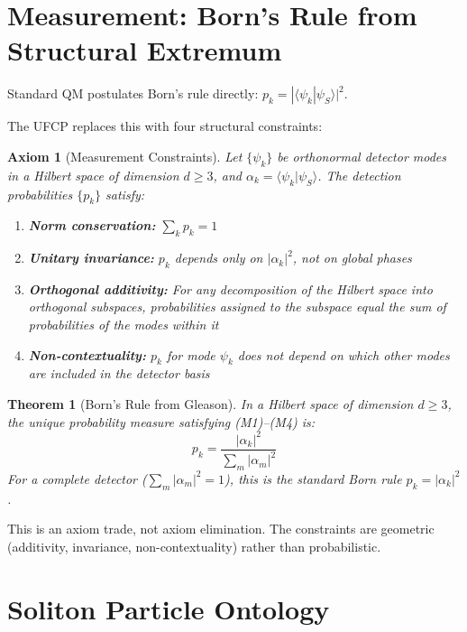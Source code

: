 \documentclass[11pt, a4paper]{article}
\newtheorem{axiom}{Axiom}[section]
\newtheorem{theorem}{Theorem}[section]
\begin{document}
\section{Measurement: Born's Rule from Structural Extremum}

Standard QM postulates Born's rule directly:
$p_k = |\langle \psi_k | \psi_S \rangle|^2$.

The UFCP replaces this with four structural constraints:

\begin{axiom}[Measurement Constraints]
Let $\{\psi_k\}$ be orthonormal detector modes in a Hilbert space
of dimension $d \geq 3$, and
$\alpha_k = \langle \psi_k | \psi_S \rangle$. The detection
probabilities $\{p_k\}$ satisfy:
\begin{enumerate}[label=(M\arabic*)]
  \item \textbf{Norm conservation:} $\sum_k p_k = 1$
  \item \textbf{Unitary invariance:} $p_k$ depends only on
        $|\alpha_k|^2$, not on global phases
  \item \textbf{Orthogonal additivity:} For any decomposition of
        the Hilbert space into orthogonal subspaces, probabilities
        assigned to the subspace equal the sum of probabilities of
        the modes within it
  \item \textbf{Non-contextuality:} $p_k$ for mode $\psi_k$ does
        not depend on which other modes are included in the detector
        basis
\end{enumerate}
\end{axiom}

\begin{theorem}[Born's Rule from Gleason]
In a Hilbert space of dimension $d \geq 3$, the unique probability
measure satisfying (M1)--(M4) is:
\begin{equation}
  p_k = \frac{|\alpha_k|^2}{\sum_m |\alpha_m|^2}
\end{equation}
For a complete detector ($\sum_m |\alpha_m|^2 = 1$), this is the
standard Born rule $p_k = |\alpha_k|^2$.
\end{theorem}

This is an axiom trade, not axiom elimination. The constraints are
geometric (additivity, invariance, non-contextuality) rather than
probabilistic.

\section{Soliton Particle Ontology}
\end{document}
